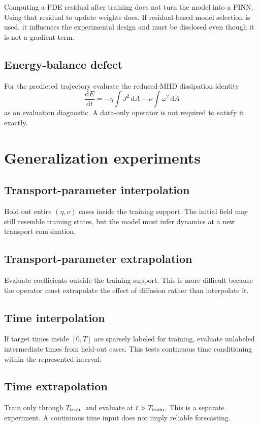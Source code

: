 \documentclass[11pt]{article}
\newcommand{\dd}{\mathrm{d}}
\begin{document}
\begin{warningbox}
Computing a PDE residual after training does not turn the model into a PINN. Using that residual to update weights does. If residual-based model selection is used, it influences the experimental design and must be disclosed even though it is not a gradient term.
\end{warningbox}

\subsection{Energy-balance defect}
For the predicted trajectory evaluate the reduced-MHD dissipation identity
\[
\frac{\dd E}{\dd t}
=-\eta\int J^2\,\dd A-\nu\int\omega^2\,\dd A
\]
as an evaluation diagnostic. A data-only operator is not required to satisfy it exactly.

\section{Generalization experiments}
\label{sec:generalization}

\subsection{Transport-parameter interpolation}
Hold out entire $(\eta,\nu)$ cases inside the training support. The initial field may still resemble training states, but the model must infer dynamics at a new transport combination.

\subsection{Transport-parameter extrapolation}
Evaluate coefficients outside the training support. This is more difficult because the operator must extrapolate the effect of diffusion rather than interpolate it.

\subsection{Time interpolation}
If target times inside $[0,T]$ are sparsely labeled for training, evaluate unlabeled intermediate times from held-out cases. This tests continuous time conditioning within the represented interval.

\subsection{Time extrapolation}
Train only through $T_{\rm train}$ and evaluate at $t>T_{\rm train}$. This is a separate experiment. A continuous time input does not imply reliable forecasting.
\end{document}
